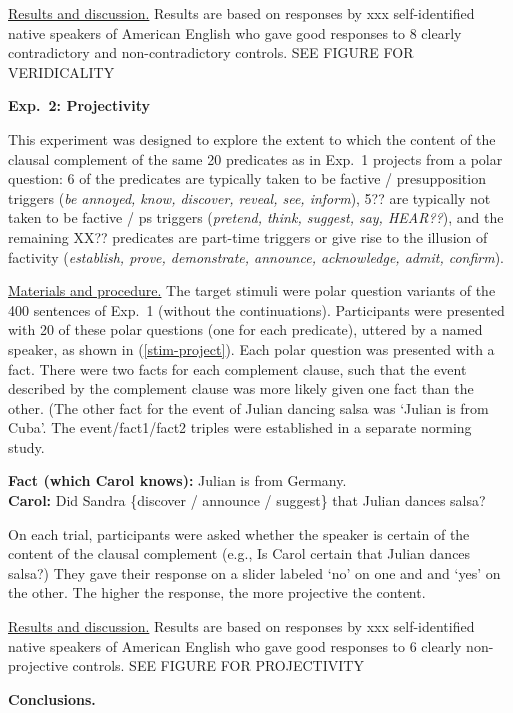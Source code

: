 \documentclass[12pt]{article}
\newcommand{\6}{\mbox{$[\hspace*{-.6mm}[$}}
\newcommand{\9}{\mbox{$]\hspace*{-.6mm}]$}}
\begin{document}
\underline{Results and discussion.} Results are based on responses by xxx self-identified native speakers of American English who gave good responses to 8 clearly contradictory and non-contradictory controls. SEE FIGURE FOR VERIDICALITY 

{\bf Exp.~2: Projectivity}

This experiment was designed to explore the extent to which the content of the clausal complement of the same 20 predicates as in Exp.~1 projects from a polar question: 6 of the predicates are typically taken to be factive / presupposition triggers ({\em be annoyed, know, discover, reveal, see, inform}), 5?? are typically not taken to be factive / ps triggers ({\em pretend, think, suggest, say, HEAR??}), and the remaining XX?? predicates are part-time triggers or give rise to the illusion of factivity ({\em establish, prove, demonstrate, announce, acknowledge, admit, confirm}).

\underline{Materials and procedure.} The target stimuli were polar question variants of the 400 sentences of Exp.~1 (without the continuations). Participants were presented with 20 of these polar questions (one for each predicate), uttered by a named speaker, as shown in (\ref{stim-project}). Each polar question was presented with a fact. There were two facts for each complement clause, such that the event described by the complement clause was more likely given one fact than the other. (The other fact for the event of Julian dancing salsa was `Julian is from Cuba'. The event/fact1/fact2 triples were established in a separate norming study.
\vspace*{-.2cm}
\begin{exe}
\ex\label{stim-project} {\bf Fact (which Carol knows):} Julian is from Germany.  \\ 
{\bf Carol:} Did Sandra \{discover / announce / suggest\} that Julian dances salsa?
\end{exe}
\vspace*{-.2cm}
On each trial, participants were asked whether the speaker is certain of the content of the clausal complement (e.g., Is Carol certain that Julian dances salsa?) They gave their response on a slider labeled `no' on one and and `yes' on the other. The higher the response, the more projective the content.

\underline{Results and discussion.} Results are based on responses by xxx self-identified native speakers of American English who gave good responses to 6 clearly non-projective controls.  SEE FIGURE FOR PROJECTIVITY 

{\bf Conclusions.}

\newpage


\begin{small}


\end{small}
\end{document}
